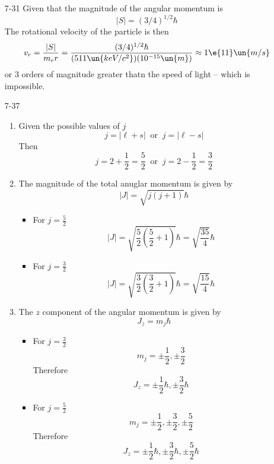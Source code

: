 \documentclass[12pt]{2620hw}
\begin{document}
\maketitle

\begin{enumerate}

\item [7-31] Given that the magnitude of the angular momentum is
\[
	|S| = (3/4)^{1/2} \hbar
\]
The rotational velocity of the particle is then 
\[
	v_r = \frac{|S|}{m_er} = \frac{(3/4)^{1/2}\hbar}{(511\un{keV/c^2})(10^{-15}\un{m})} \approx 1\e{11}\un{m/s} 
\]
or 3 orders of magnitude greater thatn the speed of light -- which is impossible.

\item [7-37] 
\begin{enumerate}
	\item Given the possible values of $j$
	\[
		j = | \ell + s | \;\;\text{or}\;\; j = | \ell - s | 
	\]
	Then 
	\[
		j = 2 + \frac{1}{2} = \frac{5}{2} \;\;\text{or}\;\; j = 2 - \frac{1}{2} = \frac{3}{2}
	\]
	\item The magnitude of the total anuglar momentum is given by
	\[
		|J|	= \sqrt{ j ( j + 1) } \hbar
	\]
	\begin{itemize}
		\item For $j = \frac{5}{2}$
		\[
			|J|	= \sqrt{ \frac{5}{2} \left( \frac{5}{2} + 1 \right) } \hbar  = \sqrt{ \frac{35}{4} } \hbar
		\]
		\item For $j = \frac{3}{2}$
		\[
			|J|	= \sqrt{ \frac{3}{2} \left( \frac{3}{2} + 1 \right) } \hbar = \sqrt{ \frac{15}{4} } \hbar
		\]
		
	\end{itemize}
	\item The $z$ component of the angular momentum is given by 
	\[
		J_z = m_j \hbar	
	\]
	\begin{itemize}
		\item For $j = \frac{3}{2}$
		\[
			m_j = \pm \frac{1}{2}, \pm \frac{3}{2}
		\]
		Therefore
		\[
			J_z = \pm \frac{1}{2}\hbar, \pm \frac{3}{2}\hbar
		\]
		\item For $j = \frac{5}{2}$
		\[
			m_j = \pm \frac{1}{2}, \pm \frac{3}{2}, \pm \frac{5}{2}
		\]
		Therefore
		\[
			J_z = \pm \frac{1}{2}\hbar, \pm \frac{3}{2}\hbar, \pm \frac{5}{2}\hbar
		\]
		
	\end{itemize}
\end{enumerate}


\end{enumerate}
\end{document}
